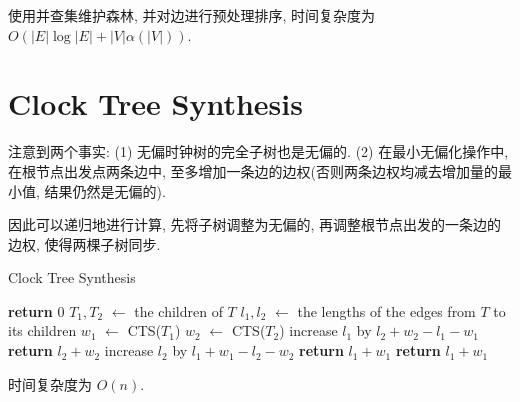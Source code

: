 \documentclass{ctexart}
\newcommand{\Let}[1]{\State #1 $\gets$}
\newcommand{\F}[2]{\textsc{#1}(#2)}
\newcommand{\Ret}[1]{\State \textbf{return} #1}
\begin{document}
使用并查集维护森林, 并对边进行预处理排序, 时间复杂度为 $O(|E|\log |E|+|V|\alpha(|V|))$.

\section{Clock Tree Synthesis}

注意到两个事实: (1) 无偏时钟树的完全子树也是无偏的. (2) 在最小无偏化操作中, 在根节点出发点两条边中, 至多增加一条边的边权(否则两条边权均减去增加量的最小值, 结果仍然是无偏的).

因此可以递归地进行计算, 先将子树调整为无偏的, 再调整根节点出发的一条边的边权, 使得两棵子树同步.

\begin{algorithm}[H]
    \caption{Clock Tree Synthesis}
    \begin{algorithmic}
            \Ret{0}
        \EndIf
        \Let{$T_1, T_2$} the children of $T$
        \Let{$l_1, l_2$} the lengths of the edges from $T$ to its children
        \Let{$w_1$} \F{CTS}{$T_1$}
        \Let{$w_2$} \F{CTS}{$T_2$}
            \State increase $l_1$ by $l_2+w_2-l_1-w_1$
            \Ret{$l_2+w_2$}
            \State increase $l_2$ by $l_1+w_1-l_2-w_2$
            \Ret{$l_1+w_1$}
        \EndIf
        \Ret{$l_1+w_1$}
        \EndFunction
    \end{algorithmic}
\end{algorithm}

时间复杂度为 $O(n)$.
\end{document}

